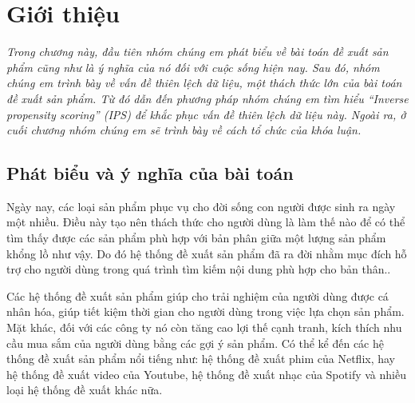 \chapter{Giới thiệu}
\label{Chapter1}



\noindent \textit{Trong chương này, đầu tiên nhóm chúng em phát biểu về bài toán đề xuất sản phẩm cũng như là ý nghĩa của nó đối với cuộc sống hiện nay. Sau đó, nhóm chúng em trình bày về vấn đề thiên lệch dữ liệu, một thách thức lớn của bài toán đề xuất sản phẩm. Từ đó dẫn đến phương pháp nhóm chúng em tìm hiểu ``Inverse propensity scoring'' (IPS) để khắc phục vấn đề thiên lệch dữ liệu này. Ngoài ra, ở cuối chương nhóm chúng em sẽ trình bày về cách tổ chức của khóa luận.}

\section{Phát biểu và ý nghĩa của bài toán}
Ngày nay, các loại sản phẩm phục vụ cho đời sống con người được sinh ra ngày một nhiều. Điều này tạo nên thách thức cho người dùng là làm thế nào để có thể tìm thấy được các sản phẩm phù hợp với bản phân giữa một lượng sản phẩm khổng lồ như vậy. Do đó hệ thống đề xuất sản phẩm đã ra đời nhằm mục đích hỗ trợ cho người dùng trong quá trình tìm kiếm nội dung phù hợp cho bản thân..

Các hệ thống đề xuất sản phẩm giúp cho trải nghiệm của người dùng được cá nhân hóa, giúp tiết kiệm thời gian cho người dùng trong việc lựa chọn sản phẩm. Mặt khác, đối với các công ty nó còn tăng cao lợi thế cạnh tranh, kích thích nhu cầu mua sắm của người dùng bằng các gợi ý sản phẩm. Có thể kể đến các hệ thống đề xuất sản phẩm nổi tiếng như: hệ thống đề xuất phim của Netflix, hay hệ thống đề xuất video của Youtube, hệ thống đề xuất nhạc của Spotify và nhiều loại hệ thống đề xuất khác nữa.

